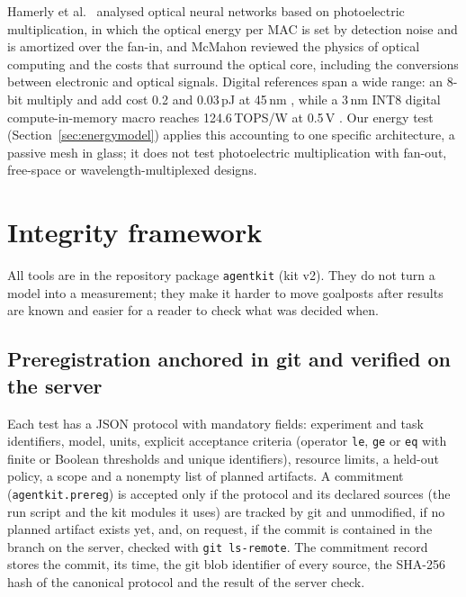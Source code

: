 \documentclass[11pt,a4paper]{article}
\begin{document}
Hamerly et al.\ \cite{Hamerly2019} analysed optical neural networks based on photoelectric multiplication, in which the optical energy per MAC is set by detection noise and is amortized over the fan-in, and McMahon \cite{McMahon2023} reviewed the physics of optical computing and the costs that surround the optical core, including the conversions between electronic and optical signals. Digital references span a wide range: an 8-bit multiply and add cost 0.2 and 0.03\,pJ at 45\,nm \cite{Horowitz2014}, while a 3\,nm INT8 digital compute-in-memory macro reaches 124.6\,TOPS/W at 0.5\,V \cite{Mori2026}. Our energy test (Section~\ref{sec:energymodel}) applies this accounting to one specific architecture, a passive mesh in glass; it does not test photoelectric multiplication with fan-out, free-space or wavelength-multiplexed designs.

\section{Integrity framework}
\label{sec:integrity}

All tools are in the repository package \texttt{agentkit} (kit v2). They do not turn a model into a measurement; they make it harder to move goalposts after results are known and easier for a reader to check what was decided when.

\subsection{Preregistration anchored in git and verified on the server}

Each test has a JSON protocol with mandatory fields: experiment and task identifiers, model, units, explicit acceptance criteria (operator \texttt{le}, \texttt{ge} or \texttt{eq} with finite or Boolean thresholds and unique identifiers), resource limits, a held-out policy, a scope and a nonempty list of planned artifacts. A commitment (\texttt{agentkit.prereg}) is accepted only if the protocol and its declared sources (the run script and the kit modules it uses) are tracked by git and unmodified, if no planned artifact exists yet, and, on request, if the commit is contained in the branch on the server, checked with \texttt{git ls-remote}. The commitment record stores the commit, its time, the git blob identifier of every source, the SHA-256 hash of the canonical protocol and the result of the server check.
\end{document}
